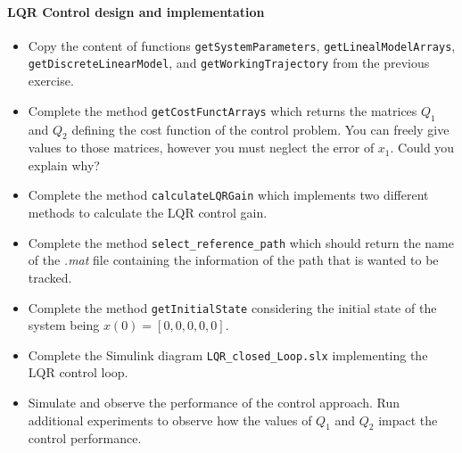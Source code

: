 	\paragraph{LQR Control design and implementation}
	\begin{itemize}
		\item Copy the content of functions \texttt{getSystemParameters}, \texttt{getLinealModelArrays}, \newline\texttt{getDiscreteLinearModel}, and \texttt{getWorkingTrajectory} from the previous exercise. 
		\item Complete the method \texttt{getCostFunctArrays} which returns the matrices $Q_1$ and $Q_2$ defining the cost function of the control problem.
			  You can freely give values to those matrices, however you must neglect the error of $x_1$.
			  Could you explain why?
		\item Complete the method \texttt{calculateLQRGain} which implements two different methods to calculate the LQR control gain.
		\item Complete the method \texttt{select\_reference\_path} which should return the name of the \emph{.mat} file containing the information of the path that is wanted to be tracked.
		\item Complete the method \texttt{getInitialState} considering the initial state of the system being $x(0) = \left[0,0,0,0,0\right]$.
		\item Complete the Simulink diagram \texttt{LQR\_closed\_Loop.slx} implementing the LQR control loop. 
		\item Simulate and observe the performance of the control approach.
			  Run additional experiments to observe how the values of $Q_1$ and $Q_2$ impact the control performance.
	\end{itemize}
